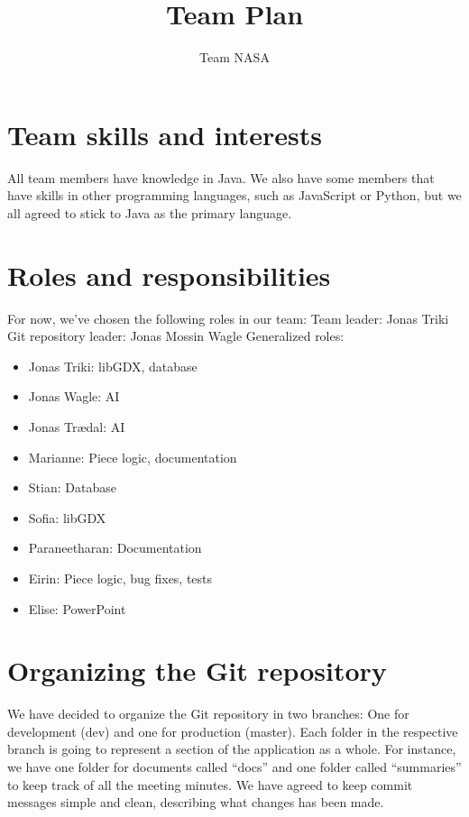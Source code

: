 \documentclass{article}
\title{Team Plan}
\author{Team NASA}
\date{}
\begin{document}
\maketitle

\section*{Team skills and interests}
All team members have knowledge in Java. We also have some members that have skills in other programming languages, such as JavaScript or Python, but we all agreed to stick to Java as the primary language.

\section*{Roles and responsibilities}
For now, we've chosen the following roles in our team:
\newline Team leader: Jonas Triki
\newline Git repository leader: Jonas Mossin Wagle
\newline Generalized roles:
\begin{itemize}
    \item Jonas Triki: libGDX, database
    \item Jonas Wagle: AI
    \item Jonas Trædal: AI 
    \item Marianne: Piece logic, documentation
    \item Stian: Database
    \item Sofia: libGDX
    \item Paraneetharan: Documentation
    \item Eirin: Piece logic, bug fixes, tests
    \item Elise: PowerPoint
    
\end{itemize}



\section*{Organizing the Git repository}

We have decided to organize the Git repository in two branches: One for development (dev) and one for production (master). Each folder in the respective branch is going to represent a section of the application as a whole. For instance, we have one folder for documents called “docs” and one folder called “summaries” to keep track of all the meeting minutes. We have agreed to keep commit messages simple and clean, describing what changes has been made.
\end{document}
